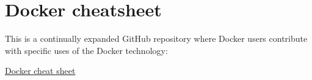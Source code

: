\chapter{Docker cheatsheet}\label{ANX:csd}

This is a continually expanded GitHub repository where Docker users contribute with specific uses of the Docker technology:

\href{https://github.com/wsargent/docker-cheat-sheet}{Docker cheat sheet}
